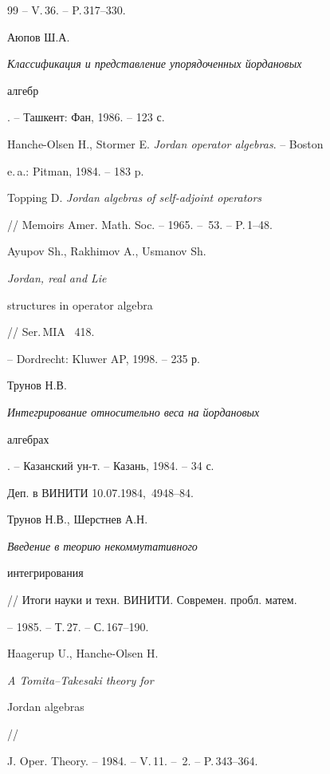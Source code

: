 \begin{thebibliography}{99}
-- V.\,36. -- P.\,317--330. 




Аюпов Ш.А. {\em Классификация и представление упорядоченных йордановых 


алгебр}. -- Ташкент: Фан, 1986. -- 123 с. 




Hanche-Olsen H., Stormer E. {\em Jordan operator algebras}. -- Boston 


e.\,a.: Pitman, 1984. -- 183 p. 




Topping D. {\em Jordan algebras of self-adjoint operators} 


// Memoirs Amer. Math. Soc. -- 1965. -- \No\,53. -- P.\,1--48. 




Ayupov Sh., Rakhimov A., Usmanov Sh. {\em Jordan, real and Lie 


structures in operator algebra} // Ser.\,MIA \No\, 418. 


-- Dordrecht: Kluwer AP, 1998. -- 235 р. 




Трунов Н.В. {\em Интегрирование относительно веса на йордановых 


алгебрах}. -- Казанский ун-т. -- Казань, 1984. -- 34 с. 


Деп. в ВИНИТИ 10.07.1984, \No\,4948--84. 




Трунов Н.В., Шерстнев А.Н. {\em Введение в теорию некоммутативного 


интегрирования} // Итоги науки и техн. ВИНИТИ. Современ. пробл. матем. 


-- 1985. -- Т.\,27. -- С.\,167--190. 


 


\end{thebibliography} 


 


\vskip 2cm 


 






 


\label{end} 


 


 


Haagerup U., Hanche-Olsen H. {\em A Tomita--Takesaki theory for 


Jordan algebras} // 


J. Oper. Theory. -- 1984. -- V.\,11. -- \No\,2. -- P.\,343--364. 


 


 


